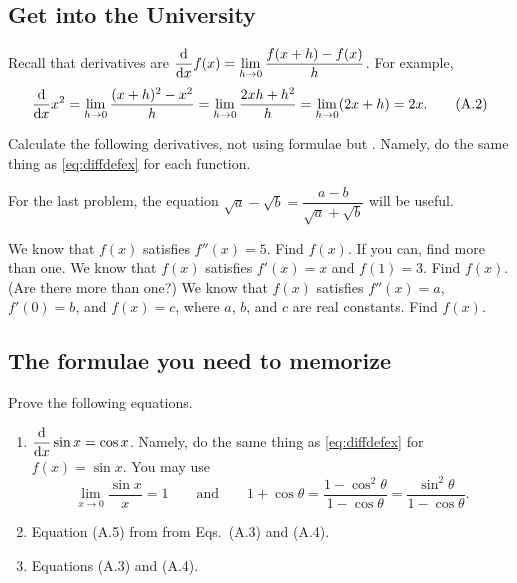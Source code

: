 \documentclass[11pt,pdfa,lastpage]{MishoNote}
\begin{document}
\subsection{Get into the University}
Recall that derivatives are 
$\displaystyle\diff{}{x}f(x)=\lim_{h\to 0}\frac{f(x+h)-f(x)}{h}$. For example,
\begin{equation}
  \diff{}{x}x^2=\lim_{h\to 0}\frac{(x+h)^2-x^2}{h}=\lim_{h\to 0}\frac{2xh+h^2}{h}=\lim_{h\to 0}(2x+h)=2x.
  \label{eq:diffdefex}\tag{A.2}
\end{equation}
\medskip
\begin{enumerate}[resume]
  \itemC Calculate the following derivatives, not using formulae but . Namely, do the same thing as \eqref{eq:diffdefex} for each function.
  \medskip
  \begin{menumerate}{3}
  \end{menumerate}
  For the last problem, the equation $\displaystyle\sqrt{a}-\sqrt{b}=\dfrac{a-b}{\sqrt{a}+\sqrt{b}}$ will be useful.

  \itemA We know that $f(x)$ satisfies $f''(x)=5$. Find $f(x)$. If you can, find more than one.
  \itemB We know that $f(x)$ satisfies $f'(x)=x$ and $f(1)=3$. Find $f(x)$. (Are there more than one?)
  \itemC We know that $f(x)$ satisfies $f''(x)=a$, $f'(0)=b$, and $f(x)=c$, where $a$, $b$, and $c$ are real constants. Find $f(x)$.
\end{enumerate}

\subsection{The formulae you need to memorize}

\begin{enumerate}[resume]
 \itemC Prove the following equations.
\begin{enumerate}
  \item $\displaystyle\diff{}{x}\sin x=\cos x$. Namely, do the same thing as \eqref{eq:diffdefex} for $f(x)=\sin x$. You may use
\begin{equation*}
  \lim_{x\to 0}\frac{\sin x}{x}=1\qquad\text{and}\qquad1+\cos\theta = \frac{1-\cos^2\theta}{1-\cos\theta} = \frac{\sin^2\theta}{1-\cos\theta}.
\end{equation*}
  \item Equation (A.5) from from Eqs.~(A.3) and (A.4).
  \item Equations (A.3) and (A.4). 
\end{enumerate} 
\end{enumerate}
\end{document}
